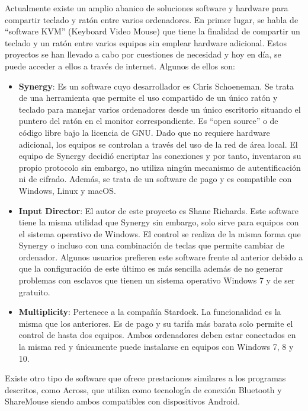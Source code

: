 Actualmente existe un amplio abanico de soluciones software y hardware para compartir teclado y ratón entre varios ordenadores. En primer lugar, se habla de ``software KVM'' (Keyboard Video Mouse) que tiene la finalidad de compartir un teclado y un ratón entre varios equipos sin emplear hardware adicional. Estos proyectos se han llevado a cabo por cuestiones de necesidad y hoy en día, se puede acceder a ellos a través de internet. Algunos de ellos son:

\begin{itemize}
    \item {\bfseries Synergy}: Es un software cuyo desarrollador es Chris Schoeneman. Se trata de una herramienta que permite el uso compartido de un único ratón y teclado para manejar varios ordenadores desde un único escritorio situando el puntero del ratón en el monitor correspondiente. Es ``open source'' o de código libre bajo la licencia de GNU. Dado que no requiere hardware adicional, los equipos se controlan a través del uso de la red de área local. El equipo de Synergy decidió encriptar las conexiones y por tanto, inventaron su propio protocolo sin embargo, no utiliza ningún mecanismo de autentificación ni de cifrado. Además, se trata de un software de pago y es compatible con Windows, Linux y macOS.
    \item {\bfseries Input Director}: El autor de este proyecto es Shane Richards. Este software tiene la misma utilidad que Synergy sin embargo, solo sirve para equipos con el sistema operativo de Windows. El control se realiza de la misma forma que Synergy o incluso con una combinación de teclas que permite cambiar de ordenador. Algunos usuarios prefieren este software frente al anterior debido a que la configuración de este último es más sencilla además de no generar problemas con esclavos que tienen un sistema operativo Windows 7 y de ser gratuito.
    \item {\bfseries Multiplicity}: Pertenece a la compañía Stardock. La funcionalidad es la misma que los anteriores. Es de pago y su tarifa más barata solo permite el control de hasta dos equipos. Ambos ordenadores deben estar conectados en la misma red y únicamente puede instalarse en equipos con Windows 7, 8 y 10.
\end{itemize}

Existe otro tipo de software que ofrece prestaciones similares a los programas descritos, como Across, que utiliza como tecnología de conexión Bluetooth y ShareMouse siendo ambos compatibles con dispositivos Android.

